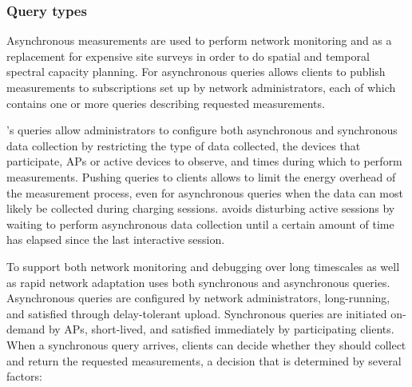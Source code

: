 \subsubsection{Query types}

Asynchronous measurements are used to perform network monitoring and as a
replacement for expensive site surveys in order to do spatial and temporal
spectral capacity planning. For asynchronous queries \PS{} allows clients to
publish measurements to subscriptions set up by network administrators, each
of which contains one or more queries describing requested measurements.

\PS{}'s queries allow administrators to configure both asynchronous and
synchronous data collection by restricting the type of data collected, the
devices that participate, APs or active devices to observe, and times during
which to perform measurements. Pushing queries to clients allows \PS{} to
limit the energy overhead of the measurement process, even for asynchronous
queries when the data can most likely be collected during charging sessions.
\PS{} avoids disturbing active sessions by waiting to perform asynchronous
data collection until a certain amount of time has elapsed since the last
interactive session.

To support both network monitoring and debugging over long timescales as well
as rapid network adaptation \PS{} uses both synchronous and asynchronous
queries. Asynchronous queries are configured by network administrators,
long-running, and satisfied through delay-tolerant upload. Synchronous
queries are initiated on-demand by APs, short-lived, and satisfied
immediately by participating clients. When a synchronous query arrives,
\PS{} clients can decide whether they should collect and return the requested
measurements, a decision that is determined by several factors:

